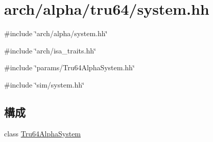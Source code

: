 \hypertarget{arch_2alpha_2tru64_2system_8hh}{
\section{arch/alpha/tru64/system.hh}
\label{arch_2alpha_2tru64_2system_8hh}
}
{\ttfamily \#include \char`\"{}arch/alpha/system.hh\char`\"{}}\par
{\ttfamily \#include \char`\"{}arch/isa\_\-traits.hh\char`\"{}}\par
{\ttfamily \#include \char`\"{}params/Tru64AlphaSystem.hh\char`\"{}}\par
{\ttfamily \#include \char`\"{}sim/system.hh\char`\"{}}\par
\subsection*{構成}
\begin{DoxyCompactItemize}
\item 
class \hyperlink{classTru64AlphaSystem}{Tru64AlphaSystem}
\end{DoxyCompactItemize}

